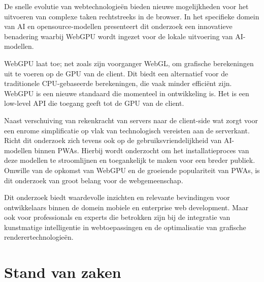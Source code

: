 \bigbreak{}
De snelle evolutie van webtechnologieën bieden nieuwe mogelijkheden voor het uitvoeren van complexe taken rechtstreeks in de browser. In het specifieke domein van AI en opensource-modellen presenteert dit onderzoek een innovatieve benadering waarbij WebGPU wordt ingezet voor de lokale uitvoering van AI-modellen.

\bigbreak{}
WebGPU laat toe; net zoals zijn voorganger WebGL, om grafische berekeningen uit te voeren op de GPU van de client. Dit biedt een alternatief voor de traditionele CPU-gebaseerde berekeningen, die vaak minder efficiënt zijn. WebGPU is een nieuwe standaard die momenteel in ontwikkeling is. Het is een low-level API die toegang geeft tot de GPU van de client.

\bigbreak{}
Naast verschuiving van rekenkracht van servers naar de client-side wat zorgt voor een enrome simplificatie op vlak van technologisch vereisten aan de serverkant. Richt dit onderzoek zich tevens ook op de gebruiksvriendelijkheid van AI-modellen binnen PWAs. Hierbij wordt onderzocht om het installatieproces van deze modellen te stroomlijnen en toegankelijk te maken voor een breder publiek. Omwille van de opkomst van WebGPU en de groeiende populariteit van PWAs, is dit onderzoek van groot belang voor de webgemeenschap.

\bigbreak{}
Dit onderzoek biedt waardevolle inzichten en relevante bevindingen voor ontwikkelaars binnen de domein mobiele en enterprise web development. Maar ook voor professionals en experts die betrokken zijn bij de integratie van kunstmatige intelligentie in webtoepassingen en de optimalisatie van grafische renderertechnologieën.

\newpage

\section{Stand van zaken}%
\label{sec:stand van zaken}


